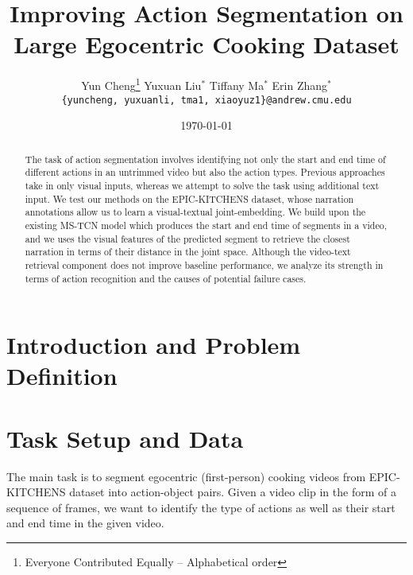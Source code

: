 \documentclass[11pt,a4paper]{article}
\title{Improving Action Segmentation on Large Egocentric Cooking Dataset}
\author{
  Yun Cheng\thanks{\hspace{4pt}Everyone Contributed Equally -- Alphabetical order} \hspace{2em} Yuxuan Liu$^*$ \hspace{2em} Tiffany Ma$^*$ \hspace{2em} Erin Zhang$^*$ \\
  \texttt{\{yuncheng, yuxuanli, tma1, xiaoyuz1\}@andrew.cmu.edu}
}
\date{\today}
\begin{document}
\maketitle
\begin{abstract}
The task of action segmentation involves identifying not only the start and end time of different actions in an untrimmed video but also the action types. Previous approaches take in only visual inputs, whereas we attempt to solve the task using additional text input. We test our methods on the EPIC-KITCHENS dataset, whose narration annotations allow us to learn a visual-textual joint-embedding. We build upon the existing MS-TCN model which produces the start and end time of segments in a video, and we uses the visual features of the predicted segment to retrieve the closest narration in terms of their distance in the joint space. Although the video-text retrieval component does not improve baseline performance, we analyze its strength in terms of action recognition and the causes of potential failure cases. 
\end{abstract}

\section{Introduction and Problem Definition}







\section{Task Setup and Data}
The main task is to segment egocentric (first-person) cooking videos from EPIC-KITCHENS dataset into action-object pairs. Given a video clip in the form of a sequence of frames, we want to identify the type of actions as well as their start and end time in the given video.
\end{document}
